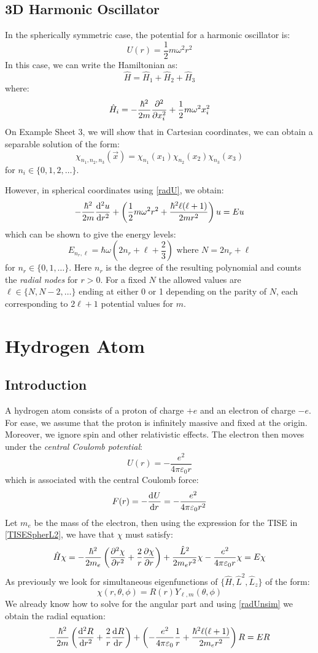 \documentclass[../main.tex]{subfiles}
\begin{document}
\subsection{3D Harmonic Oscillator}
In the spherically symmetric case, the potential for a harmonic oscillator is:
\[
  U(r) = \frac{1}{2} m\omega^2 r^2
\]
In this case, we can write the Hamiltonian as:
\[
  \hat{H} = \hat{H}_1 + \hat{H}_2 + \hat{H}_3
\]
where:
\[
  \hat{H}_i = -\frac{\hbar^2}{2m} \pderiv[2]{}{x_i} + \frac{1}{2} m\omega^2x^2_i
\]
On Example Sheet 3, we will show that in Cartesian coordinates, we can obtain a separable solution of the form:
\[
  \chi_{n_1, n_2, n_3}(\vec{x}) = \chi_{n_1}(x_1) \chi_{n_2}(x_2) \chi_{n_3}(x_3)
\]
for $n_i \in \{0, 1, 2, \ldots\}$.

However, in spherical coordinates using \cref{radU}, we obtain:
\[
  - \frac{\hbar^2}{2m} \deriv[2]{u}{r} + \left(\frac{1}{2} m\omega^2r^2 + \frac{\hbar^2\ell(\ell + 1)}{2mr^2}\right)u = E u
\]
which can be shown to give the energy levels:
\[
  E_{n_r, \ell} = \hbar\omega\left(2n_r + \ell + \frac{2}{3}\right) \text{ where } N = 2n_r + \ell
\]
for $n_r \in \{0, 1, \ldots\}$.
Here $n_r$ is the degree of the resulting polynomial and counts the \textit{radial nodes} for $r > 0$.
For a fixed $N$ the allowed values are $\ell \in \{N, N - 2, \ldots\}$ ending at either 0 or 1 depending on the parity of $N$, each corresponding to $2\ell + 1$ potential values for $m$.
\section{Hydrogen Atom}
\subsection{Introduction}
A hydrogen atom consists of a proton of charge $+e$ and an electron of charge $-e$.
For ease, we assume that the proton is infinitely massive and fixed at the origin.
Moreover, we ignore spin and other relativistic effects.
The electron then moves under the \textit{central Coulomb potential}:
\[
  U(r) = - \frac{e^2}{4\pi \varepsilon_0 r}
\]
which is associated with the central Coulomb force:
\[
  F(r) = -\deriv{U}{r} = - \frac{e^2}{4\pi \varepsilon_0 r^2}
\]
Let $m_e$ be the mass of the electron, then using the expression for the TISE in \cref{TISESpherL2}, we have that $\chi$ must satisfy:
\[
  \hat{H} \chi = -\frac{\hbar^2}{2m_e} \left(\pderiv[2]{\chi}{r} + \frac{2}{r} \pderiv{\chi}{r}\right) + \frac{\hat{L}^2}{2m_e r^2}\chi - \frac{e^2}{4\pi \varepsilon_0 r} \chi = E\chi
\]
As previously we look for simultaneous eigenfunctions of $\{\hat{H}, \hat{L}^2, \hat{L}_z\}$ of the form:
\[
  \chi(r, \theta, \phi) = R(r) Y_{\ell, m}(\theta, \phi)
\]
We already know how to solve for the angular part and using \cref{radUnsim} we obtain the radial equation:
\[
  -\frac{\hbar^2}{2m}\left(\deriv[2]{R}{r} + \frac{2}{r}\deriv{R}{r}\right) + \left(-\frac{e^2}{4 \pi \varepsilon_0} \frac{1}{r} + \frac{\hbar^2\ell(\ell + 1)}{2m_e r^2}\right)R = ER
\]
\end{document}
